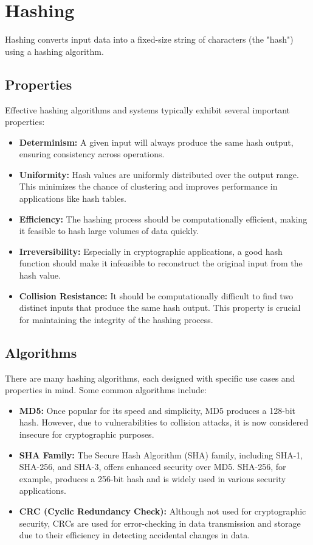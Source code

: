 \section{Hashing}

Hashing converts input data into a fixed-size string of 
characters (the "hash") using a hashing algorithm. 

\subsection{Properties}

Effective hashing algorithms and systems typically exhibit several important properties:

\begin{itemize}
    \item \textbf{Determinism:} A given input will always produce the same hash output, ensuring consistency across operations.
    \item \textbf{Uniformity:} Hash values are uniformly distributed over the output range. This minimizes the chance of clustering and improves performance in applications like hash tables.
    \item \textbf{Efficiency:} The hashing process should be computationally efficient, making it feasible to hash large volumes of data quickly.
    \item \textbf{Irreversibility:} Especially in cryptographic applications, a good hash function should make it infeasible to reconstruct the original input from the hash value.
    \item \textbf{Collision Resistance:} It should be computationally difficult to find two distinct inputs that produce the same hash output. This property is crucial for maintaining the integrity of the hashing process.
\end{itemize}

\subsection{Algorithms}

There are many hashing algorithms, each designed with specific use cases and properties in mind. Some common algorithms include:

\begin{itemize}
    \item \textbf{MD5:} Once popular for its speed and simplicity, MD5 produces a 128-bit hash. However, due to vulnerabilities to collision attacks, it is now considered insecure for cryptographic purposes.
    \item \textbf{SHA Family:} The Secure Hash Algorithm (SHA) family, including SHA-1, SHA-256, and SHA-3, offers enhanced security over MD5. SHA-256, for example, produces a 256-bit hash and is widely used in various security applications.
    \item \textbf{CRC (Cyclic Redundancy Check):} Although not used for cryptographic security, CRCs are used for error-checking in data transmission and storage due to their efficiency in detecting accidental changes in data.
\end{itemize}

